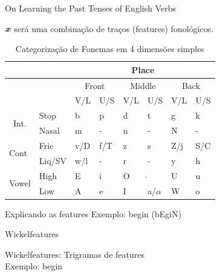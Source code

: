\documentclass[10pt]{beamer}
\begin{document}
\begin{frame}[fragile]{On Learning the Past Tenses of English Verbs \cite{Rumelhart:1986:PDP:21935}}

$\bm{x}$ será uma combinação de traços (features) fonológicos.

\begin{table}[]
\centering
\caption{Categorização de Fonemas em 4 dimensões simples}
\label{fontable}
\begin{tabular}{llllllll}
\hline
 &  & \multicolumn{6}{c}{Place} \\ \hline
 &  & \multicolumn{2}{c|}{Front} & \multicolumn{2}{c|}{Middle} & \multicolumn{2}{c}{Back} \\ \hline
 &  & \multicolumn{1}{l|}{V/L} & \multicolumn{1}{l|}{U/S} & \multicolumn{1}{l|}{V/L} & \multicolumn{1}{l|}{U/S} & \multicolumn{1}{l|}{V/L} & U/S \\ \hline
 \multicolumn{1}{c}{\multirow{2}{*}{Int.}} & Stop & b & p & d & t & g & k \\ \cline{2-8} 
\multicolumn{1}{c}{} & Nasal & m & - & n & - & N & - \\ \hline
\multirow{2}{*}{Cont} & Fric & v/D & f/T & z & s & Z/j & S/C \\ \cline{2-8} 
 & Liq/SV & w/l & - & r & - & y & h \\ \hline
 \multirow{2}{*}{Vowel} & High & E & i & O & $\hat{}$ & U & u \\ \cline{2-8} 
 & Low & A & e & I & a/$\alpha$ & W & o \\ \hline
\end{tabular}
\end{table}

\end{frame}

\begin{frame}[fragile]{Explicando as features}
Exemplo: begin (bEgiN)
\vspace{1cm}
\\


\end{frame}

\begin{frame}[fragile]{Wickelfeatures}

Wickelfeatures: Trigramas de features
\vspace{0.4cm}
\\Exemplo: begin

\end{frame}
\end{document}
